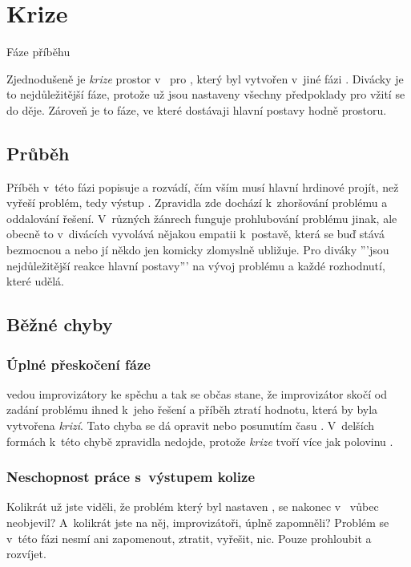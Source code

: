   
 
 
 
\needspace{5cm} \section{Krize} \label{krize} {{Fáze příběhu}} 
 
Zjednodušeně je \textit{krize} prostor v~ pro  , který byl vytvořen v~jiné fázi . Divácky je to nejdůležitější fáze, protože už jsou nastaveny všechny předpoklady pro vžití se do děje. Zároveň je to fáze, ve které dostávaji hlavní postavy hodně prostoru. 
 
 
\subsection{ Průběh } Příběh v~této fázi popisuje a rozvádí, čím vším musí hlavní hrdinové projít, než vyřeší problém, tedy výstup . Zpravidla zde dochází k~zhoršování problému a oddalování řešení. V~různých žánrech funguje prohlubování problému jinak, ale obecně to v~divácích vyvolává nějakou empatii k~postavě, která se buď stává bezmocnou a nebo jí někdo jen komicky zlomyslně ubližuje. Pro diváky '''jsou nejdůležitější reakce hlavní postavy''' na vývoj problému a každé rozhodnutí, které udělá.  
 
 
\subsection{ Běžné chyby }  
\subsubsection{ Úplné přeskočení fáze }  vedou improvizátory ke spěchu a tak se občas stane, že improvizátor skočí od zadání problému ihned k~jeho řešení a příběh ztratí hodnotu, která by byla vytvořena \textit{krizí}. Tato chyba se dá opravit  nebo posunutím času . V~delších formách k~této chybě zpravidla nedojde, protože \textit{krize} tvoří více jak polovinu . 
 
\subsubsection{ Neschopnost práce s~výstupem kolize } Kolikrát už jste viděli, že problém který byl nastaven , se nakonec v~ vůbec neobjevil? A~kolikrát jste na něj, improvizátoři, úplně zapomněli? Problém se v~této fázi nesmí ani zapomenout, ztratit, vyřešit, nic. Pouze prohloubit a rozvíjet. 
 
